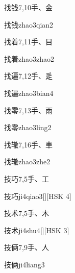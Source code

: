 \begin{entry}{找钱}{7,10}{⼿、⾦}
  \begin{phonetics}{找钱}{zhao3qian2}
  \end{phonetics}
\end{entry}

\begin{entry}{找着}{7,11}{⼿、⽬}
  \begin{phonetics}{找着}{zhao3zhao2}
  \end{phonetics}
\end{entry}

\begin{entry}{找遍}{7,12}{⼿、⾡}
  \begin{phonetics}{找遍}{zhao3bian4}
  \end{phonetics}
\end{entry}

\begin{entry}{找零}{7,13}{⼿、⾬}
  \begin{phonetics}{找零}{zhao3ling2}
  \end{phonetics}
\end{entry}

\begin{entry}{找辙}{7,16}{⼿、⾞}
  \begin{phonetics}{找辙}{zhao3zhe2}
  \end{phonetics}
\end{entry}

\begin{entry}{技巧}{7,5}{⼿、⼯}
  \begin{phonetics}{技巧}{ji4qiao3}[][HSK 4]
  \end{phonetics}
\end{entry}

\begin{entry}{技术}{7,5}{⼿、⽊}
  \begin{phonetics}{技术}{ji4shu4}[][HSK 3]
  \end{phonetics}
\end{entry}

\begin{entry}{技俩}{7,9}{⼿、⼈}
  \begin{phonetics}{技俩}{ji4liang3}
  \end{phonetics}
\end{entry}

